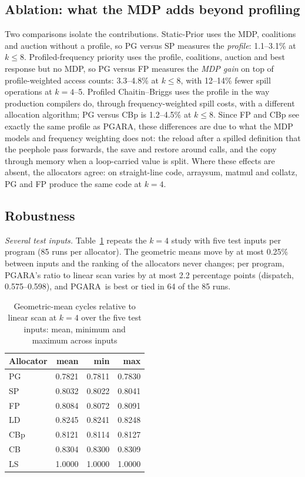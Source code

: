 \documentclass{ieeeaccess}
\newcommand{\MG}{PGARA}
\begin{document}
\subsection{Ablation: what the MDP adds beyond profiling}
\label{sec:ablation}

Two comparisons isolate the contributions. Static-Prior uses the MDP,
coalitions and auction without a profile, so PG versus SP measures the
\emph{profile}: 1.1--3.1\% at $k\le8$. Profiled-frequency priority uses
the profile, coalitions, auction and best response but no MDP, so PG
versus FP measures the \emph{MDP gain} on top of profile-weighted
access counts: 3.3--4.8\% at $k\le8$, with 12--14\% fewer spill
operations at $k=4$--5. Profiled Chaitin--Briggs uses the profile in the
way production compilers do, through frequency-weighted spill costs,
with a different allocation algorithm; PG versus CBp is 1.2--4.5\% at
$k\le8$. Since FP and CBp see exactly the same profile as \MG, these
differences are due to what the MDP models and frequency weighting does
not: the reload after a spilled definition that the peephole pass
forwards, the save and restore around calls, and the copy through
memory when a loop-carried value is split. Where these effects are
absent, the allocators agree: on straight-line code, arraysum, matmul
and collatz, PG and FP produce the same code at $k=4$.

\subsection{Robustness}
\label{sec:robust}

\textit{Several test inputs.} Table~\ref{tab:inputs} repeats the $k=4$
study with five test inputs per program (85 runs per allocator). The
geometric means move by at most 0.25\% between inputs and the ranking
of the allocators never changes; per program, \MG's ratio to linear
scan varies by at most 2.2 percentage points (dispatch, 0.575--0.598),
and \MG\ is best or tied in 64 of the 85 runs.

\begin{table}[t]
\centering
\caption{Geometric-mean cycles relative to linear scan at $k=4$ over the
five test inputs: mean, minimum and maximum across inputs}
\label{tab:inputs}
\footnotesize
\begin{tabular}{@{}lrrr@{}}
\toprule
Allocator & mean & min & max \\
\midrule
PG & 0.7821 & 0.7811 & 0.7830 \\
SP & 0.8032 & 0.8022 & 0.8041 \\
FP & 0.8084 & 0.8072 & 0.8091 \\
LD & 0.8245 & 0.8241 & 0.8248 \\
CBp & 0.8121 & 0.8114 & 0.8127 \\
CB & 0.8304 & 0.8300 & 0.8309 \\
LS & 1.0000 & 1.0000 & 1.0000 \\
\bottomrule
\end{tabular}
\end{table}
\end{document}

